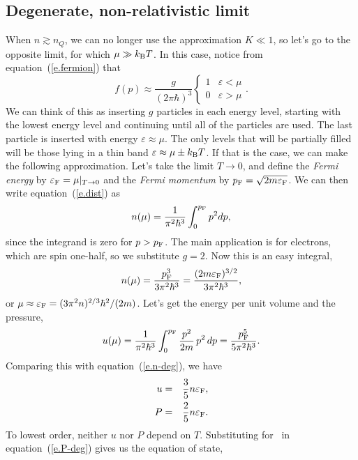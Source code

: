 \subsection{Degenerate, non-relativistic limit}\label{s.deg-limit-fermions}
When $n\gtrsim n_{Q}$, we can no longer use the approximation $K \ll 1$, so let's go to the opposite limit, for which $\mu \gg k_\mathrm{B} T$.  In this case, notice from equation~(\ref{e.fermion}) that
\begin{equation}
f(p) \approx \frac{g}{(2\pi\hbar)^{3}}\left\{\begin{array}{lr} 1 & \varepsilon < \mu\\ 0 & \varepsilon> \mu\end{array}\right. .
\end{equation}
We can think of this as inserting $g$ particles in each energy level, starting with the lowest energy level and continuing until all of the particles are used. The last particle is inserted with energy $\varepsilon \approx \mu$.  The only levels that will be partially filled will be those lying in a thin band $\varepsilon \approx\mu \pm k_\mathrm{B} T$.  If that is the case, we can make the following approximation.  Let's take the limit $T \to 0$, and define the \emph{Fermi energy} by $\varepsilon_{\mathrm{F}} = \mu|_{T\to 0}$ and the \emph{Fermi momentum} by $p_{\mathrm{F}} = \sqrt{2m\varepsilon_{\mathrm{F}}}$.  We can then write equation~(\ref{e.dist}) as
\begin{equation}
n(\mu) = \frac{1}{\pi^{2}\hbar^{3}}\int_{0}^{p_{\mathrm{F}}} p^{2} dp,
\end{equation}
since the integrand is zero for $p > p_{\mathrm{F}}$.  The main application is for electrons, which are spin one-half, so we substitute $g = 2$. Now this is an easy integral,
\begin{equation}\label{e.n-deg}
n(\mu) = \frac{p_{\mathrm{F}}^{3}}{3\pi^{2}\hbar^{3}} = \frac{(2m\varepsilon_{\mathrm{F}})^{3/2}}{3\pi^{2}\hbar^{3}},
\end{equation}
or $\mu \approx \varepsilon_{\mathrm{F}} = (3\pi^{2}n)^{2/3} \hbar^{2}/(2m)$.  Let's get the energy per unit volume and the pressure,
\begin{equation}
u(\mu) = \frac{1}{\pi^{2}\hbar^{3}}\int_{0}^{p_{\mathrm{F}}} \frac{p^{2}}{2m}\,p^{2}\,dp = \frac{p_{\mathrm{F}}^{5}}{5\pi^{2}\hbar^{3}}.
\end{equation}
Comparing this with equation~(\ref{e.n-deg}), we have
\begin{eqnarray}
u &=& \frac{3}{5}n\varepsilon_{\mathrm{F}},\label{e.u-deg}\\
P &=& \frac{2}{5}n\varepsilon_{\mathrm{F}}\label{e.P-deg}.
\end{eqnarray}
To lowest order, neither $u$ nor $P$ depend on $T$.  Substituting for \eF\ in equation~(\ref{e.P-deg}) gives us the equation of state,
